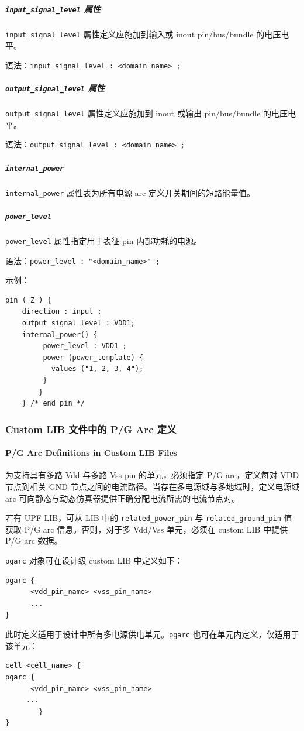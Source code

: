 \subparagraph{\texttt{input\_signal\_level} 属性}
\texttt{input\_signal\_level} 属性定义应施加到输入或 inout pin/bus/bundle 的电压电平。

语法：\texttt{input\_signal\_level : <domain\_name> ;}

\subparagraph{\texttt{output\_signal\_level} 属性}
\texttt{output\_signal\_level} 属性定义应施加到 inout 或输出 pin/bus/bundle 的电压电平。

语法：\texttt{output\_signal\_level : <domain\_name> ;}

\subparagraph{\texttt{internal\_power}}
\texttt{internal\_power} 属性表为所有电源 arc 定义开关期间的短路能量值。

\subparagraph{\texttt{power\_level}}
\texttt{power\_level} 属性指定用于表征 pin 内部功耗的电源。

语法：\texttt{power\_level : "<domain\_name>" ;}

示例：
\begin{lstlisting}
pin ( Z ) {
    direction : input ;
    output_signal_level : VDD1;
    internal_power() {
         power_level : VDD1 ;
         power (power_template) {
           values ("1, 2, 3, 4");
         }
        }
    } /* end pin */
\end{lstlisting}

\subsubsection{Custom LIB 文件中的 P/G Arc 定义}
\paragraph*{P/G Arc Definitions in Custom LIB Files}

为支持具有多路 Vdd 与多路 Vss pin 的单元，必须指定 P/G arc，定义每对 VDD 节点到相关 GND 节点之间的电流路径。当存在多电源域与多地域时，定义电源域 arc 可向静态与动态仿真器提供正确分配电流所需的电流节点对。

若有 UPF LIB，可从 LIB 中的 \texttt{related\_power\_pin} 与 \texttt{related\_ground\_pin} 值获取 P/G arc 信息。否则，对于多 Vdd/Vss 单元，必须在 custom LIB 中提供 P/G arc 数据。

\texttt{pgarc} 对象可在设计级 custom LIB 中定义如下：
\begin{lstlisting}
pgarc {
      <vdd_pin_name> <vss_pin_name>
      ...
}
\end{lstlisting}
此时定义适用于设计中所有多电源供电单元。\texttt{pgarc} 也可在单元内定义，仅适用于该单元：
\begin{lstlisting}
cell <cell_name> {
pgarc {
      <vdd_pin_name> <vss_pin_name>
     ...
        }
}
\end{lstlisting}

